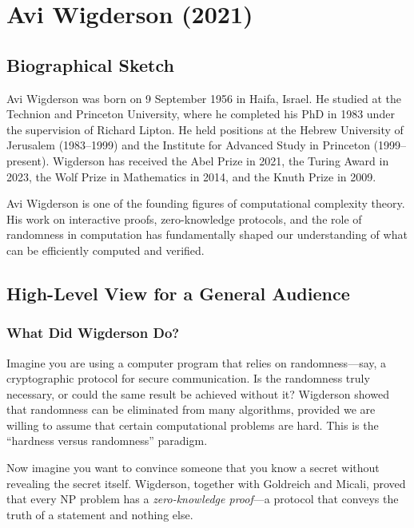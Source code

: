 \chapter{Avi Wigderson (2021)}

\section{Biographical Sketch}

Avi Wigderson was born on 9 September 1956 in Haifa, Israel. He studied at the Technion and Princeton University, where he completed his PhD in 1983 under the supervision of Richard Lipton. He held positions at the Hebrew University of Jerusalem (1983--1999) and the Institute for Advanced Study in Princeton (1999--present). Wigderson has received the Abel Prize in 2021, the Turing Award in 2023, the Wolf Prize in Mathematics in 2014, and the Knuth Prize in 2009.

Avi Wigderson is one of the founding figures of computational complexity theory. His work on interactive proofs, zero-knowledge protocols, and the role of randomness in computation has fundamentally shaped our understanding of what can be efficiently computed and verified.

\section{High-Level View for a General Audience}

\subsection{What Did Wigderson Do?}

Imagine you are using a computer program that relies on randomness---say, a cryptographic protocol for secure communication. Is the randomness truly necessary, or could the same result be achieved without it? Wigderson showed that randomness can be eliminated from many algorithms, provided we are willing to assume that certain computational problems are hard. This is the ``hardness versus randomness'' paradigm.

Now imagine you want to convince someone that you know a secret without revealing the secret itself. Wigderson, together with Goldreich and Micali, proved that every NP problem has a \emph{zero-knowledge proof}---a protocol that conveys the truth of a statement and nothing else.

